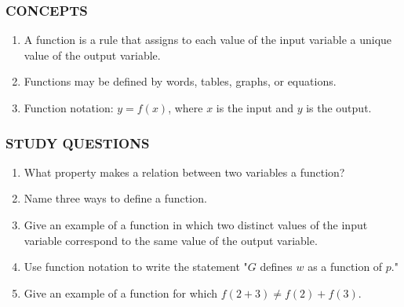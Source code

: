 \documentclass[10pt,]{book}
\theoremstyle{plain}
\theoremstyle{definition}
\theoremstyle{definition}
\theoremstyle{definition}
\begin{document}
\subsubsection[{CONCEPTS}]{CONCEPTS}\label{subsubsection-2}
\leavevmode%
\begin{enumerate}[label=\arabic*]
\item\hypertarget{li-69}{}A function is a rule that assigns to each value of the input variable a unique value of the output variable.%
\item\hypertarget{li-70}{}Functions may be defined by words, tables, graphs, or equations.%
\item\hypertarget{li-71}{}Function notation: \(y = f (x)\), where \(x\) is the input and \(y\) is the output.%
\end{enumerate}
%
\typeout{************************************************}
\typeout{************************************************}
\subsubsection[{STUDY QUESTIONS}]{STUDY QUESTIONS}\label{subsubsection-3}
\leavevmode%
\begin{enumerate}[label=\arabic*]
\item\hypertarget{li-72}{}What property makes a relation between two variables a function?%
\item\hypertarget{li-73}{}Name three ways to define a function.%
\item\hypertarget{li-74}{}Give an example of a function in which two distinct values of the input variable correspond to the same value of the output variable.%
\item\hypertarget{li-75}{}Use function notation to write the statement "\(G\) defines \(w\) as a function of \(p\)."%
\item\hypertarget{li-76}{}Give an example of a function for which \(f (2 + 3)\ne f (2) + f (3)\).%
\end{enumerate}
%
\typeout{************************************************}
\typeout{************************************************}
\end{document}
